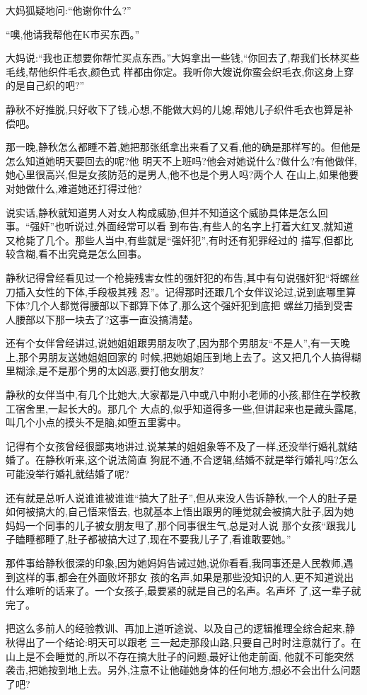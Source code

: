 ﻿\documentclass[12pt]{article}
\begin{document}
大妈狐疑地问:``他谢你什么?''

``噢,他请我帮他在K市买东西。''

大妈说:``我也正想要你帮忙买点东西。''大妈拿出一些钱,``你回去了,帮我们长林买些毛线,帮他织件毛衣,颜色式
样都由你定。我听你大嫂说你蛮会织毛衣,你这身上穿的是自己织的吧?''

静秋不好推脱,只好收下了钱,心想,不能做大妈的儿媳,帮她儿子织件毛衣也算是补偿吧。

那一晚,静秋怎么都睡不着,她把那张纸拿出来看了又看,他的确是那样写的。但他是怎么知道她明天要回去的呢?他
明天不上班吗?他会对她说什么?做什么?有他做伴,她心里很高兴,但是女孩防范的是男人,他不也是个男人吗?两个人
在山上,如果他要对她做什么,难道她还打得过他?

说实话,静秋就知道男人对女人构成威胁,但并不知道这个威胁具体是怎么回事。``强奸''也听说过,外面经常可以看
到布告,有些人的名字上打着大红叉,就知道又枪毙了几个。那些人当中,有些就是``强奸犯'',有时还有犯罪经过的
描写,但都比较含糊,看不出究竟是怎么回事。

静秋记得曾经看见过一个枪毙残害女性的强奸犯的布告,其中有句说强奸犯``将螺丝刀插入女性的下体,手段极其残
忍''。记得那时还跟几个女伴议论过,说到底哪里算下体?几个人都觉得腰部以下都算下体了,那么这个强奸犯到底把
螺丝刀插到受害人腰部以下那一块去了?这事一直没搞清楚。

还有个女伴曾经讲过,说她姐姐跟男朋友吹了,因为那个男朋友``不是人'',有一天晚上,那个男朋友送她姐姐回家的
时候,把她姐姐压到地上去了。这又把几个人搞得糊里糊涂,是不是那个男的太凶恶,要打他女朋友?

静秋的女伴当中,有几个比她大,大家都是八中或八中附小老师的小孩,都住在学校教工宿舍里,一起长大的。那几个
大点的,似乎知道得多一些,但讲起来也是藏头露尾,叫几个小点的摸头不是脑,如堕五里雾中。

记得有个女孩曾经很鄙夷地讲过,说某某的姐姐象等不及了一样,还没举行婚礼就结婚了。在静秋听来,这个说法简直
狗屁不通,不合逻辑,结婚不就是举行婚礼吗?怎么可能没举行婚礼就结婚了呢?

还有就是总听人说谁谁被谁谁``搞大了肚子'',但从来没人告诉静秋,一个人的肚子是如何被搞大的,自己悟来悟去,
也就基本上悟出跟男的睡觉就会被搞大肚子,因为她妈妈一个同事的儿子被女朋友甩了,那个同事很生气,总是对人说
那个女孩``跟我儿子瞌睡都睡了,肚子都被搞大过了,现在不要我儿子了,看谁敢要她。''

那件事给静秋很深的印象,因为她妈妈告诫过她,说你看看,我同事还是人民教师,遇到这样的事,都会在外面败坏那女
孩的名声,如果是那些没知识的人,更不知道说出什么难听的话来了。一个女孩子,最要紧的就是自己的名声。名声坏
了,这一辈子就完了。

把这么多前人的经验教训、再加上道听途说、以及自己的逻辑推理全综合起来,静秋得出了一个结论:明天可以跟老
三一起走那段山路,只要自己时时注意就行了。在山上是不会睡觉的,所以不存在搞大肚子的问题,最好让他走前面,
他就不可能突然袭击,把她按到地上去。另外,注意不让他碰她身体的任何地方,想必不会出什么问题了吧?
\end{document}
